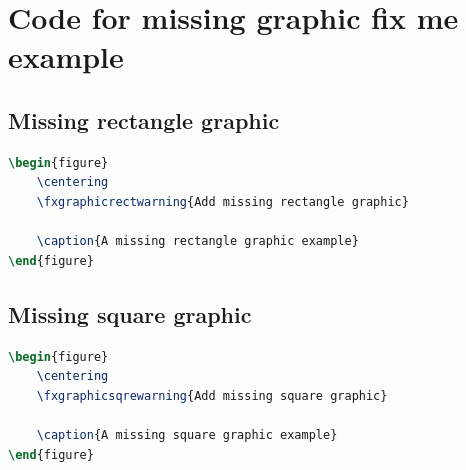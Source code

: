 \section{Code for missing graphic fix me example}
\label{code-missing-graphic-fix-me-example}

\subsection{Missing rectangle graphic}
\begin{lstlisting}[language=tex]
\begin{figure}
    \centering
    \fxgraphicrectwarning{Add missing rectangle graphic}
    
    \caption{A missing rectangle graphic example}
\end{figure}
\end{lstlisting}

\subsection{Missing square graphic}
\begin{lstlisting}[language=tex]
\begin{figure}
    \centering
    \fxgraphicsqrewarning{Add missing square graphic}
    
    \caption{A missing square graphic example}
\end{figure}
\end{lstlisting}